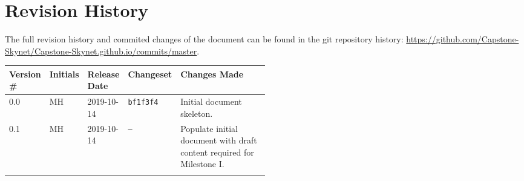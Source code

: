 \thispagestyle{empty}
\section*{Revision History}
The full revision history and commited changes of the document can be found in the git repository history: \href{https://github.com/Capstone-Skynet/Capstone-Skynet.github.io}{https://github.com/Capstone-Skynet/Capstone-Skynet.github.io/commits/master}.

\begin{table}[H]
\begin{tabular}{*{4}{l}p{0.5\linewidth}}
\hline
Version \# & Initials & Release Date & Changeset & Changes Made \\ \hline

0.0 & MH & 2019-10-14 & \texttt{bf1f3f4} & Initial document skeleton.\\
0.1 & MH & 2019-10-14 & \texttt{--} & Populate initial document with draft content required for Milestone I.\\

 & & & \\ \hline
\end{tabular}
\end{table}